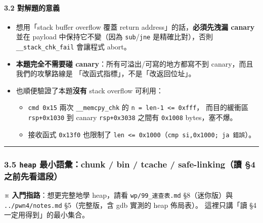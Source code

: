\documentclass[10pt,a4paper]{article}
\providecommand{\tightlist}{%
  \setlength{\itemsep}{0pt}\setlength{\parskip}{0pt}}
\renewenvironment{quote}{%
  \begin{mdframed}[linewidth=0pt,innerleftmargin=0pt,innerrightmargin=0pt,
    innerbottommargin=0pt,innertopmargin=0pt,skipabove=0.55em,skipbelow=0.55em,
    leftmargin=0.9em,rightmargin=0.4em,startcode={\color{quotebar}\vrule width 2.6pt},%
    endcode={}]%
  \itshape\color{black}%
}{%
  \end{mdframed}%
}
\begin{document}
\paragraph{3.2 對解題的意義}\label{ux5c0dux89e3ux984cux7684ux610fux7fa9}

\begin{itemize}
\tightlist
\item
  想用「stack buffer overflow 覆蓋 return
  address」的話，\textbf{必須先洩漏 canary} 並在 payload
  中保持它不變（因為 \texttt{sub}/\texttt{jne} 是精確比對），否則
  \texttt{\_\allowbreak{}\_\allowbreak{}stack\_\allowbreak{}chk\_\allowbreak{}fail} 會讓程式 abort。
\item
  \textbf{本題完全不需要碰 canary}：所有可溢出/可寫的地方都寫不到
  canary，而且我們的攻擊路線是 「改函式指標」，不是「改返回位址」。
\item
  也順便驗證了本題\textbf{沒有} stack overflow 可利用：

  \begin{itemize}
  \tightlist
  \item
    \texttt{cmd\ \allowbreak{}0x15} 兩次 \texttt{\_\allowbreak{}\_\allowbreak{}memcpy\_\allowbreak{}chk} 的
    \texttt{n\ \allowbreak{}=\ \allowbreak{}len-\allowbreak{}1\ \allowbreak{}\textless{}\allowbreak{}=\ \allowbreak{}0xfff}， 而目的緩衝區
    \texttt{rsp+0x1030} 到 canary \texttt{rsp+0x3038} 之間有
    \texttt{0x1008} bytes，塞不爆。
  \item
    接收函式 \texttt{0x13f0} 也限制了
    \texttt{len\ \allowbreak{}\textless{}\allowbreak{}=\ \allowbreak{}0x1000}（\texttt{cmp\ \allowbreak{}si,\allowbreak{}0x1000;\ \allowbreak{}ja\ \allowbreak{}錯誤}）。
  \end{itemize}
\end{itemize}

\begin{center}\rule{0.5\linewidth}{0.5pt}\end{center}

\subsubsection{\texorpdfstring{3.5 \texttt{heap} 最小語彙：chunk / bin /
tcache / safe-linking（讀 §4
之前先看這段）}{3.5 heap 最小語彙：chunk / bin / tcache / safe-linking（讀 §4 之前先看這段）}}\label{heap-ux6700ux5c0fux8a9eux5f59chunk-bin-tcache-safe-linkingux8b80-4-ux4e4bux524dux5148ux770bux9019ux6bb5}

\begin{quote}
※ \textbf{入門指路}：想更完整地學 heap，請看 \texttt{wp/\allowbreak{}99\_\allowbreak{}速查表.\allowbreak{}md}
§8（迷你版）與 \texttt{../\allowbreak{}pwn4/\allowbreak{}notes.\allowbreak{}md} §5（完整版，含 gdb 實測的 heap
佈局表）。 這裡只講「讀 §4 一定用得到」的最小集合。
\end{quote}
\end{document}

